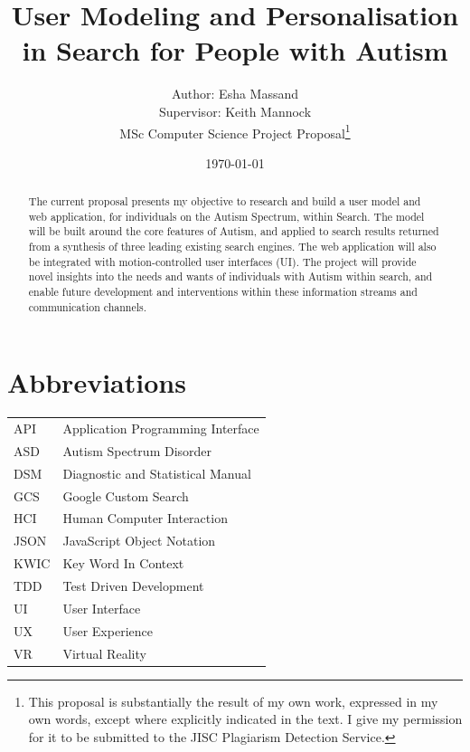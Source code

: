 \documentclass[a4paper, 10pt]{article}
\begin{document}
\title{User Modeling and Personalisation in Search for People with Autism}
\author{Author: Esha Massand\\Supervisor: Keith Mannock\\
MSc Computer Science Project Proposal\footnote{This proposal is substantially the result of my own work, expressed in my own words, except where explicitly indicated in the text. I give my permission for it to be submitted to the JISC Plagiarism Detection Service. }}
\date{\today}
\maketitle


\begin{abstract}
The current proposal presents my objective to research and build a user model and web application, for individuals on the Autism Spectrum, within Search. The model will be built around the core features of Autism, and applied to search results returned from a synthesis of three leading existing search engines. The web application will also be integrated with motion-controlled user interfaces (UI). The project will provide novel insights into the needs and wants of individuals with Autism within search, and enable future development and interventions within these information streams and communication channels.
\end{abstract}


\tableofcontents

\section{Abbreviations}
\begin{tabular}{l l }
API & Application Programming Interface\\
ASD & Autism Spectrum Disorder\\
DSM & Diagnostic and Statistical Manual\\
GCS & Google Custom Search\\
HCI & Human Computer Interaction\\
JSON & JavaScript Object Notation\\
KWIC & Key Word In Context\\
TDD & Test Driven Development\\
UI & User Interface\\
UX & User Experience\\
VR & Virtual Reality\\
\end{tabular}
\end{document}
